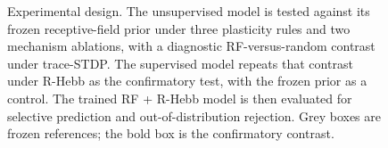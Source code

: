 \documentclass[10pt]{article}
\begin{document}
\begin{figure}[h]
\caption{Experimental design. The unsupervised model is tested against its frozen
receptive-field prior under three plasticity rules and two mechanism ablations, with a
diagnostic RF-versus-random contrast under trace-STDP. The supervised model repeats that
contrast under R-Hebb as the confirmatory test, with the frozen prior as a control. The
trained RF + R-Hebb model is then evaluated for selective prediction and
out-of-distribution rejection. Grey boxes are frozen references; the bold box is the
confirmatory contrast.}
\label{fig:exp_design}
\end{figure}
\end{document}

